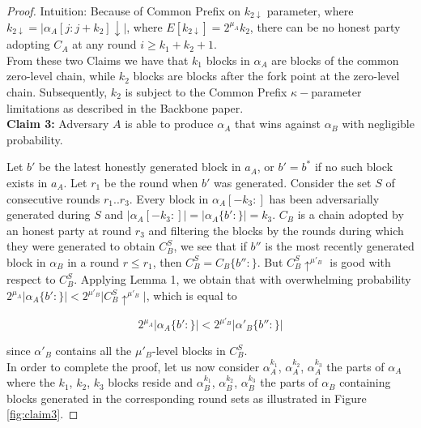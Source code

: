 \begin{proof}
	Intuition: Because of Common Prefix on $k_{2\downarrow}$ parameter, where
	$k_{2\downarrow} = \vert \alpha_A[j:j+k_2]\downarrow\vert$, where
	$E[k_{2\downarrow}] = 2^{\mu_A}k_2$, there can be no honest party adopting
	$C_A$ at any round $i \geq k_1 + k_2 + 1$. \\

	From these two Claims we have that $k_1$ blocks in $\alpha_A$ are blocks of the
	common zero-level chain, while $k_2$ blocks are blocks after the fork point at
	the zero-level chain. Subsequently, $k_2$ is subject to the Common Prefix
	$\kappa-$parameter limitations as described in the Backbone paper\cite{backbone}.\\

	\textbf{Claim 3:} Adversary $A$ is able to produce $\alpha_A$ that wins against
	$\alpha_B$ with negligible probability.

	Let $b'$ be the latest honestly generated block in $a_A$, or $b' = b^*$ if no
	such block exists in $a_A$. Let $r_1$ be the round when $b'$ was generated.
	Consider the set $S$ of consecutive rounds $r_1..r_3$. Every block in
	$\alpha_A[-k_3:]$ has been adversarially generated during $S$ and $\vert
	\alpha_A[-k_3:] \vert = \vert \alpha_A\{b':\} \vert = k_3$. $C_B$ is a chain
	adopted by an honest party at round $r_3$ and filtering the blocks by the rounds
	during which they were generated to obtain $C_B^S$, we see that if $b''$ is the
	most recently generated block in $\alpha_B$ in a round $r \leq r_1$, then $C_B^S =
	C_B\{ b'': \}$. But $C_B^S \uparrow^{\mu'_B}$ is good with respect to $C_B^S$.
	Applying Lemma 1, we obtain that with overwhelming probability  $2^{\mu_A} \vert
	\alpha_A\{b':\} \vert < 2^{\mu'_B} \vert C_B^S \uparrow^{\mu'_B} \vert$, which is
	equal to

	\begin{equation}
	2^{\mu_A} \vert \alpha_A\{b':\} \vert < 2^{\mu'_B} \vert \alpha'_B\{b'':\} \vert
	\end{equation} 

	since $\alpha'_B$ contains all the $\mu'_B$-level blocks in $C_B^S$. \\


	In order to complete the proof, let us now consider $\alpha_A^{k_1}$,
	$\alpha_A^{k_2}$, $\alpha_A^{k_3}$ the parts of $\alpha_A$ where the
	$k_1$, $k_2$, $k_3$ blocks reside and $\alpha_B^{k_1}$, $\alpha_B^{k_2}$,
	$\alpha_B^{k_3}$ the parts of $\alpha_B$ containing blocks generated in the
	corresponding round sets as illustrated in Figure \ref{fig:claim3}.


\end{proof}
